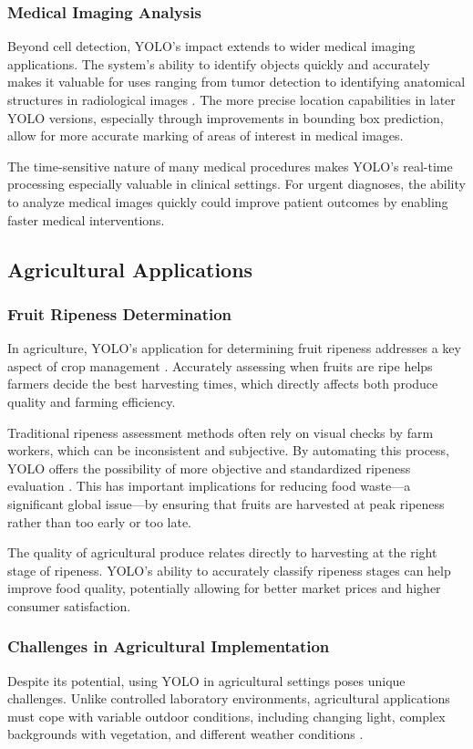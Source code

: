 \begin{multicols}{2}
	\subsubsection{Medical Imaging Analysis}
	Beyond cell detection, YOLO's impact extends to wider medical imaging applications. The system's ability to identify objects quickly and accurately makes it valuable for uses ranging from tumor detection to identifying anatomical structures in radiological images \citep{electronics8030292}. The more precise location capabilities in later YOLO versions, especially through improvements in bounding box prediction, allow for more accurate marking of areas of interest in medical images.

	The time-sensitive nature of many medical procedures makes YOLO's real-time processing especially valuable in clinical settings. For urgent diagnoses, the ability to analyze medical images quickly could improve patient outcomes by enabling faster medical interventions.

	\subsection{Agricultural Applications}
	\subsubsection{Fruit Ripeness Determination}
	In agriculture, YOLO's application for determining fruit ripeness addresses a key aspect of crop management \citep{Koirala2019}. Accurately assessing when fruits are ripe helps farmers decide the best harvesting times, which directly affects both produce quality and farming efficiency.

	Traditional ripeness assessment methods often rely on visual checks by farm workers, which can be inconsistent and subjective. By automating this process, YOLO offers the possibility of more objective and standardized ripeness evaluation \citep{KAMILARIS201870}. This has important implications for reducing food waste—a significant global issue—by ensuring that fruits are harvested at peak ripeness rather than too early or too late.

	The quality of agricultural produce relates directly to harvesting at the right stage of ripeness. YOLO's ability to accurately classify ripeness stages can help improve food quality, potentially allowing for better market prices and higher consumer satisfaction.

	\subsubsection{Challenges in Agricultural Implementation}
	Despite its potential, using YOLO in agricultural settings poses unique challenges. Unlike controlled laboratory environments, agricultural applications must cope with variable outdoor conditions, including changing light, complex backgrounds with vegetation, and different weather conditions \citep{KAMILARIS201870}.


\end{multicols}
